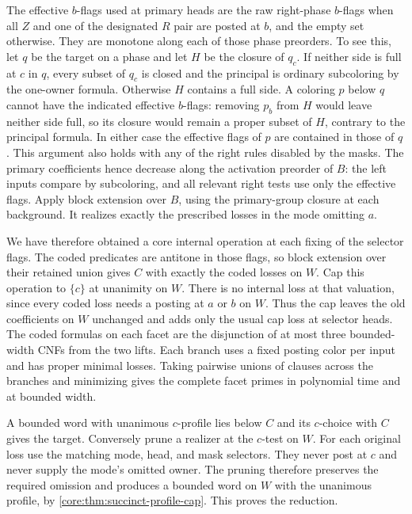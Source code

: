 The effective $b$-flags used at primary heads are the raw
right-phase $b$-flags when all $Z$ and one of the designated
$R$ pair are posted at $b$, and the empty set otherwise.
They are monotone along each of those phase preorders.
To see this, let $q$ be the target on a phase and let
$H$ be the closure of $q_c$. If neither side is full
at $c$ in $q$, every subset of $q_c$ is closed and the
principal is ordinary subcoloring by the one-owner
formula. Otherwise $H$ contains a full side. A coloring
$p$ below $q$ cannot have the indicated effective $b$-flags:
removing $p_b$ from $H$ would leave neither side full,
so its closure would remain a proper subset of $H$,
contrary to the principal formula. In either case the
effective flags of $p$ are contained in those of $q$.
This argument also holds with any of the right rules
disabled by the masks. The primary coefficients hence
decrease along the activation preorder of $B$: the left
inputs compare by subcoloring, and all relevant right
tests use only the effective flags. Apply block extension
over $B$, using the primary-group closure at each
background. It realizes exactly the prescribed losses
in the mode omitting $a$.

We have therefore obtained a core internal operation at
each fixing of the selector flags. The coded predicates
are antitone in those flags, so block extension over
their retained union gives $C$ with exactly the coded
losses on $W$. Cap this operation to $\{c\}$ at unanimity
on $W$. There is no internal loss at that valuation,
since every coded loss needs a posting at $a$ or $b$
on $W$. Thus the cap leaves the old coefficients on $W$
unchanged and adds only the usual cap loss at selector
heads. The coded formulas on each facet are the
disjunction of at most three bounded-width CNFs from
the two lifts. Each branch uses a fixed posting color
per input and has proper minimal losses. Taking
pairwise unions of clauses across the branches and
minimizing gives the complete facet primes in polynomial
time and at bounded width.

A bounded word with unanimous $c$-profile lies below
$C$ and its $c$-choice with $C$ gives the target.
Conversely prune a realizer at the $c$-test on $W$.
For each original loss use the matching mode, head, and
mask selectors. They never post at $c$ and never supply
the mode's omitted owner. The pruning therefore preserves
the required omission and produces a bounded word on
$W$ with the unanimous profile, by
\cref{core:thm:succinct-profile-cap}. This proves the reduction.


